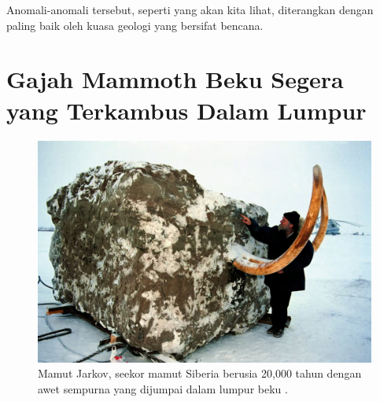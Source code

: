 \documentclass[10pt,twocolumn,letterpaper]{article}
\begin{document}
Anomali-anomali tersebut, seperti yang akan kita lihat, diterangkan dengan paling baik oleh kuasa geologi yang bersifat bencana.

\section{Gajah Mammoth Beku Segera yang Terkambus Dalam Lumpur}
\begin{figure}[b]
\begin{center}
   \includegraphics[width=1\linewidth]{jarkov-mammoth.jpg}
\end{center}
   \caption{Mamut Jarkov, seekor mamut Siberia berusia 20,000 tahun dengan awet sempurna yang dijumpai dalam lumpur beku \cite{51}.}
\label{fig:1}
\label{fig:onecol}
\end{figure}
\end{document}
